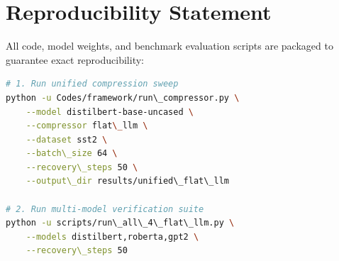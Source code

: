\section{Reproducibility Statement}
All code, model weights, and benchmark evaluation scripts are packaged to guarantee exact reproducibility:
\begin{lstlisting}[language=bash]
# 1. Run unified compression sweep
python -u Codes/framework/run\_compressor.py \
    --model distilbert-base-uncased \
    --compressor flat\_llm \
    --dataset sst2 \
    --batch\_size 64 \
    --recovery\_steps 50 \
    --output\_dir results/unified\_flat\_llm

# 2. Run multi-model verification suite
python -u scripts/run\_all\_4\_flat\_llm.py \
    --models distilbert,roberta,gpt2 \
    --recovery\_steps 50
\end{lstlisting}
